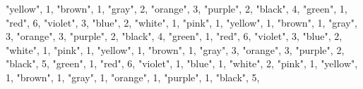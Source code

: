 \documentclass[
]{article}
\newenvironment{Shaded}{\begin{snugshade}}{\end{snugshade}}
\newcommand{\DecValTok}[1]{\textcolor[rgb]{0.00,0.00,0.81}{#1}}
\newcommand{\NormalTok}[1]{#1}
\newcommand{\StringTok}[1]{\textcolor[rgb]{0.31,0.60,0.02}{#1}}
\begin{document}
\begin{Shaded}
\begin{Highlighting}[]
  \StringTok{"yellow"}\NormalTok{, }\DecValTok{1}\NormalTok{,}
  \StringTok{"brown"}\NormalTok{, }\DecValTok{1}\NormalTok{,}
  \StringTok{"gray"}\NormalTok{, }\DecValTok{2}\NormalTok{,}
  \StringTok{"orange"}\NormalTok{, }\DecValTok{3}\NormalTok{,}
  \StringTok{"purple"}\NormalTok{, }\DecValTok{2}\NormalTok{,}
    \StringTok{"black"}\NormalTok{, }\DecValTok{4}\NormalTok{,}
  \StringTok{"green"}\NormalTok{, }\DecValTok{1}\NormalTok{,}
  \StringTok{"red"}\NormalTok{, }\DecValTok{6}\NormalTok{,}
  \StringTok{"violet"}\NormalTok{, }\DecValTok{3}\NormalTok{,}
  \StringTok{"blue"}\NormalTok{, }\DecValTok{2}\NormalTok{,}
  \StringTok{"white"}\NormalTok{, }\DecValTok{1}\NormalTok{,}
  \StringTok{"pink"}\NormalTok{, }\DecValTok{1}\NormalTok{,}
  \StringTok{"yellow"}\NormalTok{, }\DecValTok{1}\NormalTok{,}
  \StringTok{"brown"}\NormalTok{, }\DecValTok{1}\NormalTok{,}
  \StringTok{"gray"}\NormalTok{, }\DecValTok{3}\NormalTok{,}
  \StringTok{"orange"}\NormalTok{, }\DecValTok{3}\NormalTok{,}
  \StringTok{"purple"}\NormalTok{, }\DecValTok{2}\NormalTok{,}
    \StringTok{"black"}\NormalTok{, }\DecValTok{4}\NormalTok{,}
  \StringTok{"green"}\NormalTok{, }\DecValTok{1}\NormalTok{,}
  \StringTok{"red"}\NormalTok{, }\DecValTok{6}\NormalTok{,}
  \StringTok{"violet"}\NormalTok{, }\DecValTok{3}\NormalTok{,}
  \StringTok{"blue"}\NormalTok{, }\DecValTok{2}\NormalTok{,}
  \StringTok{"white"}\NormalTok{, }\DecValTok{1}\NormalTok{,}
  \StringTok{"pink"}\NormalTok{, }\DecValTok{1}\NormalTok{,}
  \StringTok{"yellow"}\NormalTok{, }\DecValTok{1}\NormalTok{,}
  \StringTok{"brown"}\NormalTok{, }\DecValTok{1}\NormalTok{,}
  \StringTok{"gray"}\NormalTok{, }\DecValTok{3}\NormalTok{,}
  \StringTok{"orange"}\NormalTok{, }\DecValTok{3}\NormalTok{,}
  \StringTok{"purple"}\NormalTok{, }\DecValTok{2}\NormalTok{,}
    \StringTok{"black"}\NormalTok{, }\DecValTok{5}\NormalTok{,}
  \StringTok{"green"}\NormalTok{, }\DecValTok{1}\NormalTok{,}
  \StringTok{"red"}\NormalTok{, }\DecValTok{6}\NormalTok{,}
  \StringTok{"violet"}\NormalTok{, }\DecValTok{1}\NormalTok{,}
  \StringTok{"blue"}\NormalTok{, }\DecValTok{1}\NormalTok{,}
  \StringTok{"white"}\NormalTok{, }\DecValTok{2}\NormalTok{,}
  \StringTok{"pink"}\NormalTok{, }\DecValTok{1}\NormalTok{,}
  \StringTok{"yellow"}\NormalTok{, }\DecValTok{1}\NormalTok{,}
  \StringTok{"brown"}\NormalTok{, }\DecValTok{1}\NormalTok{,}
  \StringTok{"gray"}\NormalTok{, }\DecValTok{1}\NormalTok{,}
  \StringTok{"orange"}\NormalTok{, }\DecValTok{1}\NormalTok{,}
  \StringTok{"purple"}\NormalTok{, }\DecValTok{1}\NormalTok{,}
    \StringTok{"black"}\NormalTok{, }\DecValTok{5}\NormalTok{, }

\end{Highlighting}
\end{Shaded}
\end{document}
